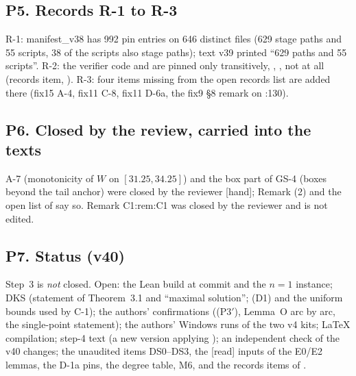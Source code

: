 \subsection*{P5. Records R-1 to R-3}
R-1: manifest\_v38 has 992 pin entries on 646 distinct files (629 stage paths and 55 scripts, 38 of the scripts also stage paths); text v39 printed ``629 paths and 55 scripts''. R-2: the verifier code and  are pinned only transitively, , ,  not at all (records item, ). R-3: four items missing from the open records list are added there (fix15 A-4, fix11 C-8, fix11 D-6a, the fix9 \S8 remark on :130).
\subsection*{P6. Closed by the review, carried into the texts}
A-7 (monotonicity of $W$ on $[31.25,34.25]$) and the box part of GS-4 (boxes beyond the tail anchor) were closed by the reviewer [hand];  Remark (2) and the open list of  say so. Remark C1:rem:C1 was closed by the reviewer and is not edited.
\subsection*{P7. Status (v40)}
Step~3 is \emph{not} closed. Open: the Lean build at commit  and the $n=1$ instance; DKS (statement of Theorem~3.1 and ``maximal solution''; (D1) and the uniform bounds used by C-1); the authors' confirmations ((P3$'$), Lemma~O arc by arc, the single-point statement); the authors' Windows runs of the two v4 kits; LaTeX compilation; step-4 text (a new version applying ); an independent check of the v40 changes; the unaudited items DS0--DS3, the [read] inputs of the E0/E2 lemmas, the D-1a pins, the  degree table, M6, and the records items of .
